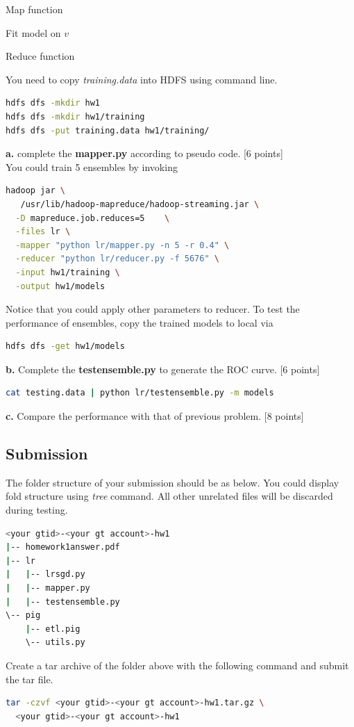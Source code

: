 \documentclass[12pt]{article}
\begin{document}
\begin{algorithm}
\BlankLine
{}
\caption{Map function}\label{algo_map}
\end{algorithm}

\begin{algorithm}
Fit model on $v$\;
\caption{Reduce function}\label{algo_reduce}
\end{algorithm}
You need to copy \textit{training.data} into HDFS using command line.
\begin{lstlisting}[language=bash,frame=single]
hdfs dfs -mkdir hw1
hdfs dfs -mkdir hw1/training
hdfs dfs -put training.data hw1/training/
\end{lstlisting}
\textbf{a.} complete the \textbf{mapper.py} according to pseudo code. [6 points]\\
You could train 5 ensembles by invoking
\begin{lstlisting}[language=bash,frame=single]
hadoop jar \
   /usr/lib/hadoop-mapreduce/hadoop-streaming.jar \
  -D mapreduce.job.reduces=5    \
  -files lr \
  -mapper "python lr/mapper.py -n 5 -r 0.4" \
  -reducer "python lr/reducer.py -f 5676" \
  -input hw1/training \
  -output hw1/models
\end{lstlisting}
Notice that you could apply other parameters to reducer. To test the performance of ensembles, copy the trained models to local via
\begin{lstlisting}[language=bash,frame=single]
hdfs dfs -get hw1/models
\end{lstlisting}
\textbf{b.} Complete the \textbf{testensemble.py} to generate the ROC curve. [6 points]
\begin{lstlisting}[language=bash,frame=single]
cat testing.data | python lr/testensemble.py -m models
\end{lstlisting}
\textbf{c.} Compare the performance with that of previous problem. [8 points]

\subsection{Submission}
The folder structure of your submission should be as below. You could display fold structure using \textit{tree} command. All other unrelated files will be discarded during testing.
\begin{lstlisting}[language=bash,frame=single]
<your gtid>-<your gt account>-hw1
|-- homework1answer.pdf
|-- lr
|   |-- lrsgd.py
|   |-- mapper.py
|   |-- testensemble.py
\-- pig
    |-- etl.pig
    \-- utils.py
\end{lstlisting}
Create a tar archive of the folder above with the following command and submit the tar file.
\begin{lstlisting}[language=bash,frame=single]
tar -czvf <your gtid>-<your gt account>-hw1.tar.gz \
  <your gtid>-<your gt account>-hw1
\end{lstlisting}
\end{document}
